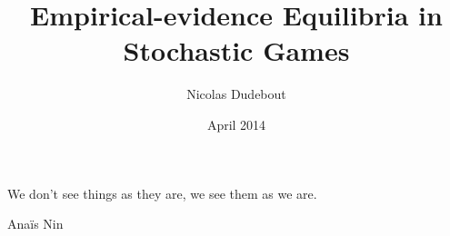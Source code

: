\title{Empirical-evidence Equilibria in Stochastic Games}
\author{Nicolas Dudebout}
\date{April 2014}
\dedication{To my ever-supportive wife, Laura.}
\epigraph{We don't see things as they are, we see them as we are.}{Anaïs Nin}
